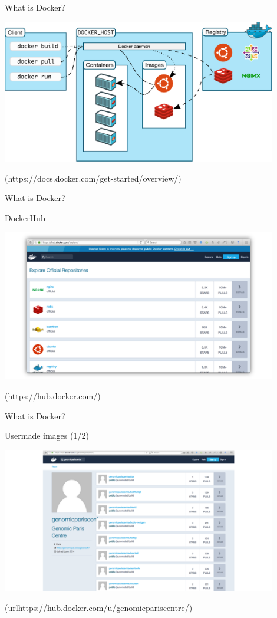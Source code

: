 \begin{frame}{What is Docker?}

\centering\includegraphics[width=12cm]{02_encapsulation/images/docker_architecture.pdf}

(https://docs.docker.com/get-started/overview/)
\end{frame}

\begin{frame}{What is Docker?}

DockerHub

\centering\includegraphics[width=12cm]{02_encapsulation/images/docker_dockerhub_offrep.png}

(https://hub.docker.com/)
\end{frame}

\begin{frame}{What is Docker?}

Usermade images (1/2)

\centering\includegraphics[width=12cm]{02_encapsulation/images/docker_dockerhub_gpc.png}

(url{https://hub.docker.com/u/genomicpariscentre/})
\end{frame}

